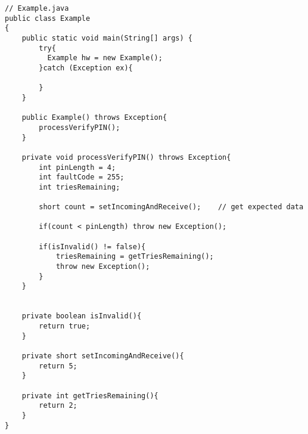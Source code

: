 \label{chap:samples}
\begin{lstlisting}[caption={Mocked Java example code from the Java Card samples},label={lst:example}]
// Example.java
public class Example 
{
    public static void main(String[] args) {
        try{
		  Example hw = new Example();
        }catch (Exception ex){

        }
    }

    public Example() throws Exception{
        processVerifyPIN();
    }

    private void processVerifyPIN() throws Exception{
        int pinLength = 4;
        int faultCode = 255;
        int triesRemaining;

        short count = setIncomingAndReceive();    // get expected data

        if(count < pinLength) throw new Exception();

        if(isInvalid() != false){
            triesRemaining = getTriesRemaining();
            throw new Exception();
        }
    }


    private boolean isInvalid(){
        return true;
    }

    private short setIncomingAndReceive(){
        return 5;
    }

    private int getTriesRemaining(){
        return 2;
    }
}
\end{lstlisting}

\newpage

